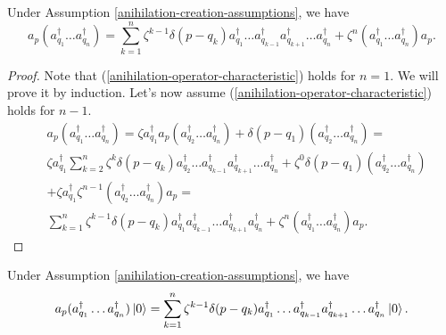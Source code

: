 \documentclass[main.tex]{subfiles}
\begin{document}
\begin{proposition}
Under Assumption \ref{anihilation-creation-assumptions}, we have
\begin{equation}
\label{anihilation-operator-characteristic}
a_p (a_{q_1}^\dagger \dots a_{q_n}^\dagger) = \sum_{k=1}^n \zeta^{k - 1} \delta(p - q_k) a_{q_1}^\dagger \dots a_{q_{k - 1}}^\dagger a_{q_{k + 1}}^\dagger  \dots  a_{q_n}^\dagger + \zeta^n( a_{q_1}^\dagger \dots a_{q_n}^\dagger)a_p.
\end{equation}
\end{proposition}
\begin{proof}
Note that (\ref{anihilation-operator-characteristic}) holds for $n = 1$. We will prove it by induction. Let's now assume (\ref{anihilation-operator-characteristic}) holds for $n - 1$.
\begin{align*}
& a_p (a_{q_1}^\dagger \dots a_{q_n}^\dagger)=
\zeta a_{q_1}^\dagger a_p (a_{q_2}^\dagger \dots a_{q_n}^\dagger) + \delta(p - q_1) (a_{q_2}^\dagger \dots a_{q_n}^\dagger)= \\
& \zeta a_{q_1}^\dagger\sum_{k=2}^n\zeta^k \delta(p - q_k) a_{q_2}^\dagger \dots a_{q_{k - 1}}^\dagger a_{q_{k + 1}}^\dagger  \dots a_{q_n}^\dagger + \zeta^0 \delta(p - q_1) (a_{q_2}^\dagger \dots a_{q_n}^\dagger) \\
& + \zeta a_{q_1}^\dagger \zeta^{n - 1}(a_{q_2}^\dagger \dots a_{q_n}^\dagger)a_p = \\
& \sum_{k=1}^n \zeta^{k - 1} \delta(p - q_k) a_{q_1}^\dagger a_{q_{k - 1}}^\dagger \dots a_{q_{k + 1}}^\dagger a_{q_n}^\dagger + \zeta^n( a_{q_1}^\dagger \dots a_{q_n}^\dagger)a_p.
\end{align*} 
\end{proof}

\begin{corollary}
Under Assumption \ref{anihilation-creation-assumptions}, we have
\begin{equation}
a_p (a_{q_1}^\dagger \dots a_{q_n}^\dagger) \ket{0} = \sum_{k=1}^n\zeta^{k-1} \delta(p - q_k) a_{q_1}^\dagger \dots a_{q_{k - 1}}^\dagger a_{q_{k + 1}}^\dagger  \dots a_{q_n}^\dagger \ket{0}.
\end{equation}
\end{corollary}
\end{document}
